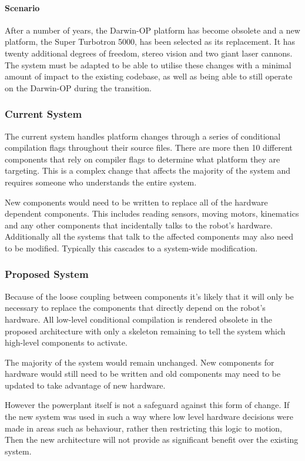\documentclass[english,12pt]{scrartcl}
\begin{document}
			\paragraph{Scenario} After a number of years, the Darwin-OP platform has become obsolete and a new platform, the Super Turbotron 5000, has been selected as its replacement. It has twenty
			additional degrees of freedom, stereo vision and two giant laser cannons. The system must be
			adapted to be able to utilise these changes with a minimal amount of impact to the existing codebase, as well as being able to still operate on the Darwin-OP during the transition.

			\subsubsection{Current System}
				The current system handles platform changes through a series of conditional compilation flags throughout their source files.
				There are more then 10 different components that rely on compiler flags to determine what platform they are targeting.
				This is a complex change that affects the majority of the system and requires someone who understands the entire system.
				
				New components would need to be written to replace all of the hardware dependent components. This includes reading sensors, moving motors, kinematics and any other components that incidentally talks to the robot's hardware.
				Additionally all the systems that talk to the affected components may also need to be modified. Typically this cascades to a system-wide modification.

			\subsubsection{Proposed System}
				Because of the loose coupling between components it's likely that it will only be necessary to replace the components that directly depend on the robot's hardware.
				All low-level conditional compilation is rendered obsolete in the proposed architecture with only a skeleton remaining to tell the system which high-level components to activate.
				
				The majority of the system would remain unchanged. New components for hardware would still need to be written and old components may need to be updated to take advantage of new hardware.
				
				However the \gls{powerplant} itself is not a safeguard against this form of change. If the new system was used in such a way where low level hardware decisions were made in areas such as behaviour, rather then restricting this logic to motion, Then the new architecture will not provide as significant benefit over the existing system.
\end{document}

